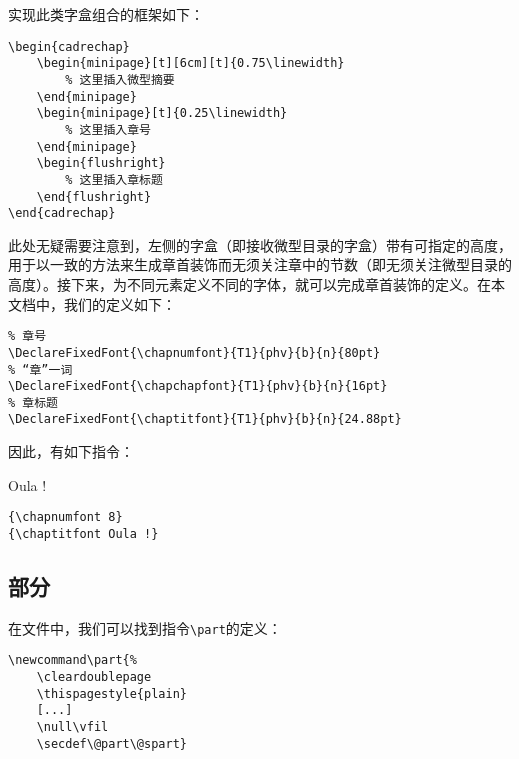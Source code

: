 
实现此类字盒组合的框架如下：

\begin{dmd}
\begin{verbatim}
\begin{cadrechap}
    \begin{minipage}[t][6cm][t]{0.75\linewidth}
        % 这里插入微型摘要 
    \end{minipage} 
    \begin{minipage}[t]{0.25\linewidth}
        % 这里插入章号
    \end{minipage}
    \begin{flushright}
        % 这里插入章标题
    \end{flushright}
\end{cadrechap}
\end{verbatim}
\end{dmd}

此处无疑需要注意到，左侧的字盒（即接收微型目录的字盒）带有可指定的高度，用于以一致的方法来生成章首装饰而无须关注章中的节数（即无须关注微型目录的高度）。接下来，为不同元素定义不同的字体，就可以完成章首装饰的定义。在本文档中，我们的定义如下：

\begin{dmd}
\begin{verbatim}
% 章号
\DeclareFixedFont{\chapnumfont}{T1}{phv}{b}{n}{80pt}
% “章”一词
\DeclareFixedFont{\chapchapfont}{T1}{phv}{b}{n}{16pt}
% 章标题
\DeclareFixedFont{\chaptitfont}{T1}{phv}{b}{n}{24.88pt}
\end{verbatim}
\end{dmd}


因此，有如下指令：

\begin{codelist}[10.2]{
    {}
    {\chaptitfont Oula !}
}\begin{verbatim}
{\chapnumfont 8}
{\chaptitfont Oula !}
\end{verbatim}
\end{codelist}

\subsection{部分}

在文件中，我们可以找到指令\verb|\part|的定义：

\begin{dmd}
\begin{verbatim}
\newcommand\part{% 
    \cleardoublepage
    \thispagestyle{plain}
    [...]
    \null\vfil
    \secdef\@part\@spart}
\end{verbatim}
\end{dmd}

